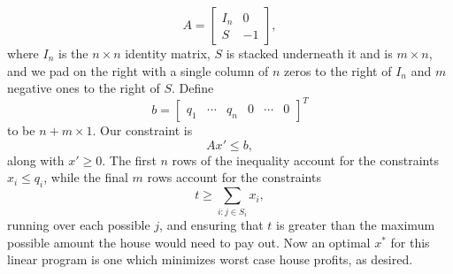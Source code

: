 \documentclass{article}
\begin{document}
\begin{enumerate}
\begin{enumerate}
\[            A = \begin{bmatrix}
                I_n & 0 \\
                S & -1
            \end{bmatrix},
        \] where $I_n$ is the $n \times n$ identity matrix, $S$ is stacked underneath it and is $m \times n$, and we pad on the right with a single column of $n$ zeros to the right of $I_n$ and $m$ negative ones to the right of $S$. Define \[
            b = \begin{bmatrix}
                q_1 & \cdots & q_n & 0 & \cdots & 0
            \end{bmatrix}^T
        \] to be $n + m \times 1$. Our constraint is \[
            Ax' \leq b,
        \] along with $x' \geq 0$. The first $n$ rows of the inequality account for the constraints $x_i \leq q_i$, while the final $m$ rows account for the constraints \[
            t \geq \sum_{i : j \in S_i} x_i,
        \] running over each possible $j$, and ensuring that $t$ is greater than the maximum possible amount the house would need to pay out. Now an optimal $x^\ast$ for this linear program is one which minimizes worst case house profits, as desired. \\


\end{enumerate}
\end{enumerate}
\end{document}
